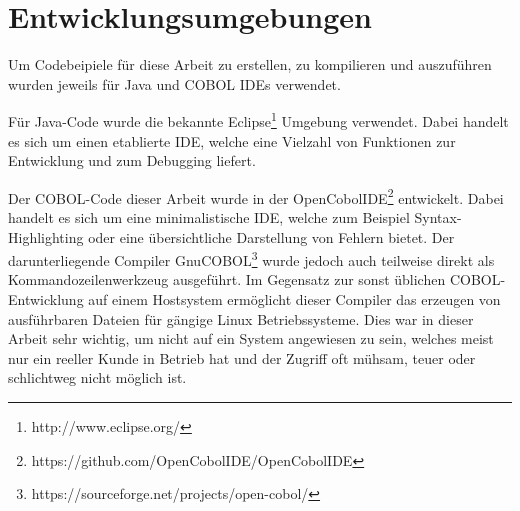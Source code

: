 \section{Entwicklungsumgebungen}
Um Codebeipiele für diese Arbeit zu erstellen, zu kompilieren und auszuführen wurden jeweils für Java und COBOL IDEs verwendet.

Für Java-Code wurde die bekannte Eclipse\footnote{http://www.eclipse.org/} Umgebung verwendet. Dabei handelt es sich um einen etablierte IDE, welche eine Vielzahl von Funktionen zur Entwicklung und zum Debugging liefert.

Der COBOL-Code dieser Arbeit wurde in der OpenCobolIDE\footnote{https://github.com/OpenCobolIDE/OpenCobolIDE} entwickelt. Dabei handelt es sich um eine minimalistische IDE, welche zum Beispiel Syntax-Highlighting oder eine übersichtliche Darstellung von Fehlern bietet. Der darunterliegende Compiler GnuCOBOL\footnote{https://sourceforge.net/projects/open-cobol/} wurde jedoch auch teilweise direkt als Kommandozeilenwerkzeug ausgeführt. Im Gegensatz zur sonst üblichen COBOL-Entwicklung auf einem Hostsystem ermöglicht dieser Compiler das erzeugen von ausführbaren Dateien für gängige Linux Betriebssysteme. Dies war in dieser Arbeit sehr wichtig, um nicht auf ein System angewiesen zu sein, welches meist nur ein reeller Kunde in Betrieb hat und der Zugriff oft mühsam, teuer oder schlichtweg nicht möglich ist.